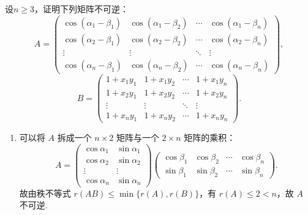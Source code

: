 \begin{exercise}
\begin{exgroup}
        \item 设$n\geqslant 3$，证明下列矩阵不可逆：
        \[A=\begin{pmatrix}
                \cos(\alpha_1-\beta_1) & \cos(\alpha_1-\beta_2) & \cdots & \cos(\alpha_1-\beta_n) \\
                \cos(\alpha_2-\beta_1) & \cos(\alpha_2-\beta_2) & \cdots & \cos(\alpha_2-\beta_n) \\
                \vdots                 & \vdots                 & \ddots & \vdots                 \\
                \cos(\alpha_n-\beta_1) & \cos(\alpha_n-\beta_2) & \cdots & \cos(\alpha_n-\beta_n)
            \end{pmatrix},\]
        \[B=\begin{pmatrix}
                1+x_1y_1 & 1+x_1y_2 & \cdots & 1+x_1y_n \\
                1+x_2y_1 & 1+x_2y_2 & \cdots & 1+x_2y_n \\
                \vdots   & \vdots   & \ddots & \vdots   \\
                1+x_ny_1 & 1+x_ny_2 & \cdots & 1+x_ny_n
            \end{pmatrix}.\]
        \begin{answer}
            \begin{enumerate}
                \item 可以将 $A$ 拆成一个 $n \times 2$ 矩阵与一个 $2 \times n$ 矩阵的乘积：
                    \[
                        A = \begin{pmatrix}
                            \cos \alpha_1 & \sin \alpha_1 \\
                            \cos \alpha_2 & \sin \alpha_2 \\
                            \vdots        & \vdots        \\
                            \cos \alpha_n & \sin \alpha_n
                        \end{pmatrix} \begin{pmatrix}
                            \cos \beta_1 & \cos \beta_2 & \cdots & \cos \beta_n \\
                            \sin \beta_1 & \sin \beta_2 & \cdots & \sin \beta_n
                        \end{pmatrix}.
                    \]
                    故由秩不等式 $r(AB) \leqslant \min\{r(A), r(B)\}$，有 $r(A) \leqslant 2 < n$，故 $A$ 不可逆.


\end{enumerate}
\end{answer}
\end{exgroup}
\end{exercise}

